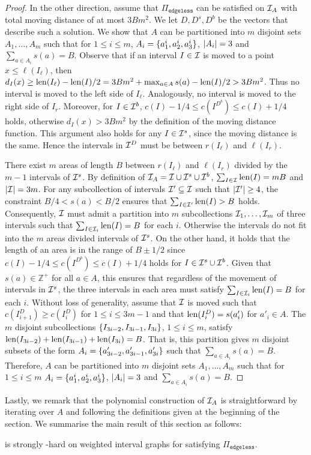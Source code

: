 \begin{proof}
    In the other direction, assume that $\Pi_{\texttt{edgeless}}$ can be satisfied on $\mathcal{I}_A$ with total moving distance of at most $3Bm^2$.
    We let $D,D^s,D^b$ be the vectors that describe such a solution.
    We show that $A$ can be partitioned into $m$ disjoint sets $A_1,\ldots,A_m$ such that for $1\le i \le m$, $A_i = \{a^i_1,a^i_2,a^i_3\}$, $|A_i| = 3$ and $\sum_{a\in A_i} s(a) = B$.
    Observe that if an interval $I\in \mathcal{I}$ is moved to a point $x \le \ell(I_\ell)$, then $d_I(x) \ge \mathrm{len}(I_\ell)-\mathrm{len}(I)/2 = 3Bm^2 + \max_{a\in A}{s(a)} - \mathrm{len}(I)/2> 3Bm^2$.
    Thus no interval is moved to the left side of $I_\ell$.
    Analogously, no interval is moved to the right side of $I_r$.
    Moreover, for $I\in \mathcal{I}^b$, $c(I)-1/4\le c(I^{D^b})\le c(I)+1/4$ holds, otherwise $d_I(x) > 3Bm^2$ by the definition of the moving distance function.
    This argument also holds for any $I \in \mathcal{I}^s$, since the moving distance is the same.
    Hence the intervals in $\mathcal{I}^D$ must be between $r(I_\ell)$ and $\ell(I_r)$.
    
    There exist $m$ areas of length $B$ between $r(I_{\ell})$ and $\ell(I_r)$ divided by the $m-1$ intervals of $\mathcal{I}^s$. 
    By definition of $\mathcal{I}_A = \mathcal{I} \cup \mathcal{I}^s\cup \mathcal{I}^b$, $\sum_{I\in \mathcal{I} } \mathrm{len}(I) = mB$ and $|\mathcal{I}| = 3m$. 
    For any subcollection of intervals $\mathcal{I}' \subseteq \mathcal{I}$ such that $|\mathcal{I}'| \ge 4$, the constraint $B/4 < s(a) < B/2$ ensures that $\sum_{I \in \mathcal{I}'} \mathrm{len}(I) > B$ holds.
    Consequently, $\mathcal{I}$ must admit a partition into $m$ subcollections $\mathcal{I}_1,\dots,\mathcal{I}_m$ of three intervals such that $\sum_{I \in \mathcal{I}_i} \mathrm{len}(I) = B$ for each $i$.
    Otherwise the intervals do not fit into the $m$ areas divided intervals of $\mathcal{I}^s$.
    On the other hand, it holds that the length of an area is in the range of $B\pm 1/2$ since $c(I)-1/4\le c(I^{D^b})\le c(I)+1/4$ holds for $I \in \mathcal{I}^s\cup \mathcal{I}^b$.
    Given that $s(a) \in \mathbb{Z}^+$ for all $a \in A$, this ensures that regardless of the movement of intervals in $\mathcal{I}^s$, the three intervals in each area must satisfy $\sum_{I \in \mathcal{I}_i} \mathrm{len}(I) = B$ for each $i$.
    Without loss of generality, assume that $\mathcal{I}$ is moved such that $c(I^D_{i+1}) \ge c(I^D_i)$ for $1\le i \le 3m-1$ and that $\mathrm{len}(I^D_i) = s(a'_i)$ for $a'_i \in A$.
    The $m$ disjoint subcollections $\{I_{3i-2},I_{3i-1},I_{3i}\}$, $1\le i \le m$, satisfy $\mathrm{len}(I_{3i-2})+\mathrm{len}(I_{3i-1})+\mathrm{len}(I_{3i}) = B$. That is, this partition gives $m$ disjoint subsets of the form $A_i = \{a'_{3i-2},a'_{3i-1},a'_{3i}\}$ such that $\sum_{a\in A_i} s(a)  = B$.
    Therefore, $A$ can be partitioned into $m$ disjoint sets $A_1,\ldots,A_m$ such that for $1\le i \le m$ $A_i = \{a^i_1,a^i_2,a^i_3\}$, $|A_i| = 3$ and $\sum_{a\in A_i} s(a) = B$.
\end{proof}
Lastly, we remark that the polynomial construction of $\mathcal{I}_A$ is straightforward by iterating over $A$ and following the definitions given at the beginning of the section. We summarise the main result of this section as follows:
\begin{theorem}\label{thm:ig_nphard_edgeless}
    {\gged} is strongly \NP-hard on weighted interval graphs for satisfying $\Pi_{\texttt{edgeless}}$.
\end{theorem}

